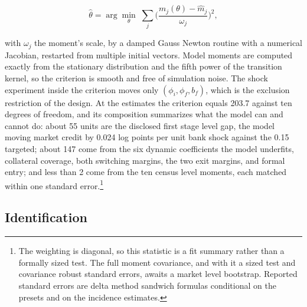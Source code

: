 \documentclass[12pt]{article}
\begin{document}
\begin{equation}
  \widehat\theta=\arg\min_{\theta}\;
  \sum_{j}\Big(\frac{m_{j}(\theta)-\hat m_{j}}{\omega_{j}}\Big)^{2},
  \label{eq:est-criterion}
\end{equation}

with $\omega_{j}$ the moment's scale, by a damped Gauss Newton routine with a numerical Jacobian, restarted from multiple initial vectors. Model moments are computed exactly from the stationary distribution and the fifth power of the transition kernel, so the criterion is smooth and free of simulation noise. The shock experiment inside the criterion moves only $(\phi_{i},\phi_{f},b_{f})$, which is the exclusion restriction of the design. At the estimates the criterion equals 203.7 against ten degrees of freedom, and its composition summarizes what the model can and cannot do: about 55 units are the disclosed first stage level gap, the model moving market credit by 0.024 log points per unit bank shock against the 0.15 targeted; about 147 come from the six dynamic coefficients the model underfits, collateral coverage, both switching margins, the two exit margins, and formal entry; and less than 2 come from the ten census level moments, each matched within one standard error.\footnote{The weighting is diagonal, so this statistic is a fit summary rather than a formally sized test. The full moment covariance, and with it a sized test and covariance robust standard errors, awaits a market level bootstrap. Reported standard errors are delta method sandwich formulas conditional on the presets and on the incidence estimates.}

\subsection{Identification}
\label{sec:est-identification}
\end{document}
